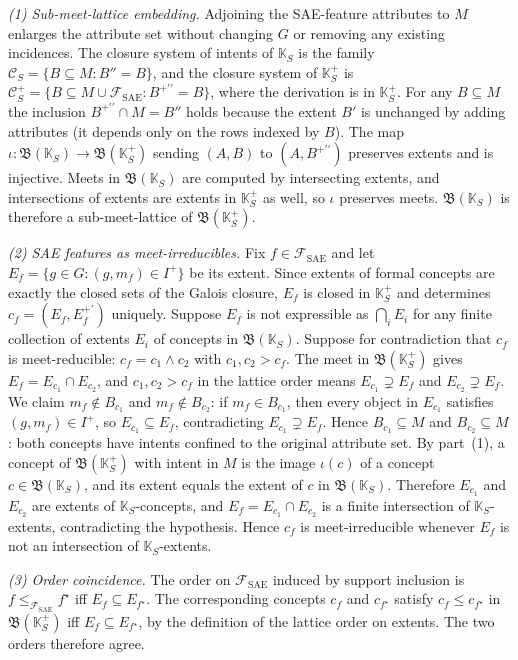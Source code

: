 \documentclass[a4paper,fleqn]{cas-dc}
\newcommand{\K}{\mathbb{K}}
\newcommand{\Lat}{\mathfrak{B}}
\newcommand{\SAE}{\mathrm{SAE}}
\newcommand{\Fsae}{\mathcal{F}_{\SAE}}
\begin{document}
\begin{pf}
\emph{(1) Sub-meet-lattice embedding.}
Adjoining the SAE-feature attributes to $M$ enlarges the attribute set without changing $G$ or removing any existing incidences.
The closure system of intents of $\K_S$ is the family $\mathcal{C}_S = \{B \subseteq M : B'' = B\}$, and the closure system of $\K_S^+$ is $\mathcal{C}_S^+ = \{B \subseteq M \cup \Fsae : B^{+\prime\prime} = B\}$, where the derivation is in $\K_S^+$.
For any $B \subseteq M$ the inclusion $B^{+\prime\prime} \cap M = B''$ holds because the extent $B'$ is unchanged by adding attributes (it depends only on the rows indexed by $B$).
The map $\iota : \Lat(\K_S) \to \Lat(\K_S^+)$ sending $(A, B)$ to $(A, B^{+\prime\prime})$ preserves extents and is injective.
Meets in $\Lat(\K_S)$ are computed by intersecting extents, and intersections of extents are extents in $\K_S^+$ as well, so $\iota$ preserves meets.
$\Lat(\K_S)$ is therefore a sub-meet-lattice of $\Lat(\K_S^+)$.

\emph{(2) SAE features as meet-irreducibles.}
Fix $f \in \Fsae$ and let $E_f = \{g \in G : (g, m_f) \in I^+\}$ be its extent.
Since extents of formal concepts are exactly the closed sets of the Galois closure, $E_f$ is closed in $\K_S^+$ and determines $c_f = (E_f, E_f^{+\prime})$ uniquely.
Suppose $E_f$ is not expressible as $\bigcap_{i} E_i$ for any finite collection of extents $E_i$ of concepts in $\Lat(\K_S)$.
Suppose for contradiction that $c_f$ is meet-reducible: $c_f = c_1 \wedge c_2$ with $c_1, c_2 > c_f$.
The meet in $\Lat(\K_S^+)$ gives $E_f = E_{c_1} \cap E_{c_2}$, and $c_1, c_2 > c_f$ in the lattice order means $E_{c_1} \supsetneq E_f$ and $E_{c_2} \supsetneq E_f$.
We claim $m_f \notin B_{c_1}$ and $m_f \notin B_{c_2}$: if $m_f \in B_{c_1}$, then every object in $E_{c_1}$ satisfies $(g, m_f) \in I^+$, so $E_{c_1} \subseteq E_f$, contradicting $E_{c_1} \supsetneq E_f$.
Hence $B_{c_1} \subseteq M$ and $B_{c_2} \subseteq M$: both concepts have intents confined to the original attribute set.
By part~(1), a concept of $\Lat(\K_S^+)$ with intent in $M$ is the image $\iota(c)$ of a concept $c \in \Lat(\K_S)$, and its extent equals the extent of $c$ in $\Lat(\K_S)$.
Therefore $E_{c_1}$ and $E_{c_2}$ are extents of $\K_S$-concepts, and $E_f = E_{c_1} \cap E_{c_2}$ is a finite intersection of $\K_S$-extents, contradicting the hypothesis.
Hence $c_f$ is meet-irreducible whenever $E_f$ is not an intersection of $\K_S$-extents.

\emph{(3) Order coincidence.}
The order on $\Fsae$ induced by support inclusion is $f \le_{\Fsae} f^\star$ iff $E_f \subseteq E_{f^\star}$.
The corresponding concepts $c_f$ and $c_{f^\star}$ satisfy $c_f \le c_{f^\star}$ in $\Lat(\K_S^+)$ iff $E_f \subseteq E_{f^\star}$, by the definition of the lattice order on extents.
The two orders therefore agree.
\end{pf}
\end{document}
